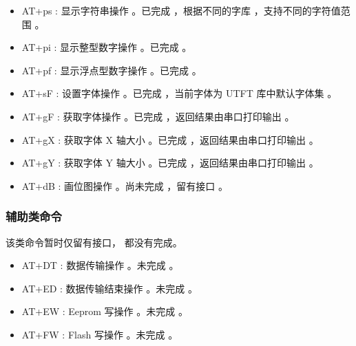 \documentclass{article}
\begin{document}
\begin{itemize}
\item AT+ps : 显示字符串操作 。已完成 ，根据不同的字库 ，支持不同的字符值范围 。
\end{itemize}
\begin{itemize}
\item AT+pi : 显示整型数字操作 。已完成 。
\end{itemize}
\begin{itemize}
\item AT+pf : 显示浮点型数字操作 。已完成 。
\end{itemize}
\begin{itemize}
\item AT+sF : 设置字体操作 。已完成 ，当前字体为 UTFT 库中默认字体集 。
\end{itemize}
\begin{itemize}
\item AT+gF : 获取字体操作 。已完成 ，返回结果由串口打印输出 。
\end{itemize}
\begin{itemize}
\item AT+gX : 获取字体 X 轴大小 。已完成 ，返回结果由串口打印输出 。
\end{itemize}
\begin{itemize}
\item AT+gY : 获取字体 Y 轴大小 。已完成 ，返回结果由串口打印输出 。
\end{itemize}
\begin{itemize}
\item AT+dB : 画位图操作 。尚未完成 ，留有接口 。
\end{itemize}

\subsubsection{辅助类命令}
\label{sec:辅助类命令}

该类命令暂时仅留有接口， 都没有完成。
\begin{itemize}
\item AT+DT : 数据传输操作 。未完成 。
\end{itemize}
\begin{itemize}
\item AT+ED : 数据传输结束操作 。未完成 。
\end{itemize}
\begin{itemize}
\item AT+EW : Eeprom 写操作 。未完成 。
\end{itemize}
\begin{itemize}
\item AT+FW : Flash 写操作 。未完成 。
\end{itemize}
\end{document}
